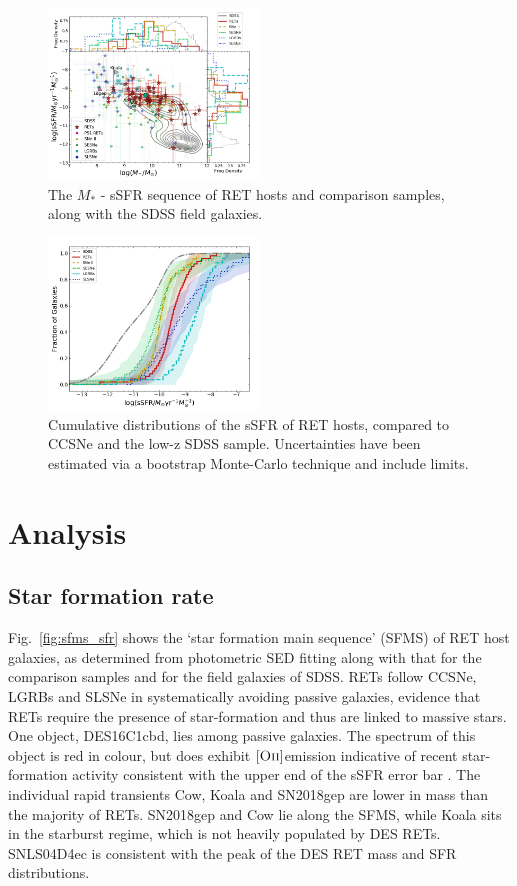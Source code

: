 \documentclass[fleqn,usenatbib,]{mnras}
\newcommand{\phil}[1]{\color{red}#1 \color{black}}
\newcommand{\replychris}[1]{\color{magenta}#1 \color{black}}
\newcommand{\OII}[0]{$[\textnormal{\textsc{Oii}}]$}
\begin{document}
\begin{figure}
\includegraphics[width=0.5\textwidth]{figs/sSFR_Mike.png}
\caption{The $M_*$ - sSFR sequence of RET hosts and comparison samples, along with the SDSS field galaxies.
\label{fig:sfms_ssfr}}
\end{figure}

\begin{figure}
\includegraphics[width=0.5\textwidth]{figs/cum_sSFR_mike.png}
\caption{Cumulative distributions of the sSFR of RET hosts, compared to CCSNe and the low-z SDSS sample. Uncertainties have been estimated via a bootstrap Monte-Carlo technique and include limits.
\label{fig:ssfr_cum}}
\end{figure}

\section{Analysis}
\label{sec:analysis} %

\subsection{Star formation rate \label{subsec:res_sfr}}
Fig.~\ref{fig:sfms_sfr} shows the `star formation main sequence' (SFMS) of RET host galaxies, \replychris{as determined from photometric SED fitting} along with that for the comparison samples and for the field galaxies of SDSS. RETs follow CCSNe, LGRBs and SLSNe in systematically avoiding passive galaxies, evidence that RETs require the presence of star-formation and thus are linked to massive stars. \phil{One object, DES16C1cbd, lies among passive galaxies. The spectrum of this object is red in colour, but does exhibit \OII emission indicative of recent star-formation activity consistent with the upper end of the sSFR error bar}. The individual rapid transients Cow, Koala and SN2018gep \replychris{are lower in mass than the majority of RETs. SN2018gep and Cow lie along the SFMS, while Koala sits in the starburst regime, which is not heavily populated by DES RETs. SNLS04D4ec is consistent with the peak of the DES RET mass and SFR distributions.} 
\end{document}
